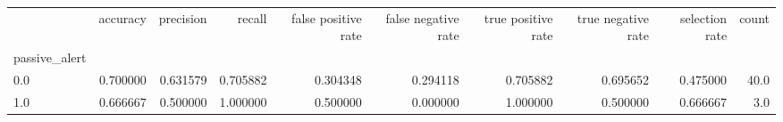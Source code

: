 \begin{tabular}{lrrrrrrrrr}
\toprule
{} &  accuracy &  precision &    recall &  false positive rate &  false negative rate &  true positive rate &  true negative rate &  selection rate &  count \\
passive\_alert &           &            &           &                      &                      &                     &                     &                 &        \\
\midrule
0.0           &  0.700000 &   0.631579 &  0.705882 &             0.304348 &             0.294118 &            0.705882 &            0.695652 &        0.475000 &   40.0 \\
1.0           &  0.666667 &   0.500000 &  1.000000 &             0.500000 &             0.000000 &            1.000000 &            0.500000 &        0.666667 &    3.0 \\
\bottomrule
\end{tabular}
